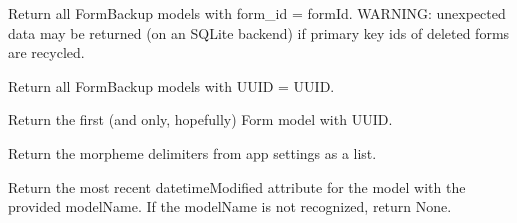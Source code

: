 \documentclass[letterpaper,10pt,english]{sphinxmanual}
\begin{document}

\begin{fulllineitems}
\label{api:old.lib.utils.getFormBackupsByFormId}
Return all FormBackup models with form\_id = formId.  WARNING: unexpected
data may be returned (on an SQLite backend) if primary key ids of deleted
forms are recycled.

\end{fulllineitems}


\begin{fulllineitems}
\label{api:old.lib.utils.getFormBackupsByUUID}
Return all FormBackup models with UUID = UUID.

\end{fulllineitems}


\begin{fulllineitems}
\label{api:old.lib.utils.getFormByUUID}
Return the first (and only, hopefully) Form model with UUID.

\end{fulllineitems}


\begin{fulllineitems}
\label{api:old.lib.utils.getMorphemeDelimiters}
Return the morpheme delimiters from app settings as a list.

\end{fulllineitems}


\begin{fulllineitems}
\label{api:old.lib.utils.getMostRecentModificationDatetime}
Return the most recent datetimeModified attribute for the model with the
provided modelName.  If the modelName is not recognized, return None.

\end{fulllineitems}
\end{document}
